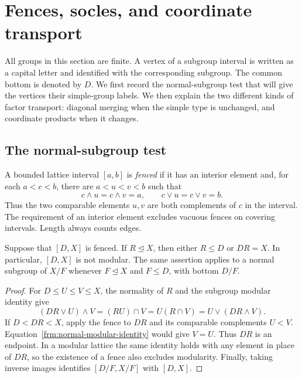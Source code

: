 \section{Fences, socles, and coordinate transport}
\label{sec:framework}

All groups in this section are finite. A vertex of a subgroup interval is
written as a capital letter and identified with the corresponding subgroup.
The common bottom is denoted by $D$. We first record the normal-subgroup
test that will give the vertices their simple-group labels. We then explain
the two different kinds of factor transport: diagonal merging when the
simple type is unchanged, and coordinate products when it changes.

\subsection{The normal-subgroup test}

\begin{definition}
A bounded lattice interval $[a,b]$ is \emph{fenced} if it has an interior
element and, for each $a<c<b$, there are $a<u<v<b$ such that
\[
 c\wedge u=c\wedge v=a,
 \qquad c\vee u=c\vee v=b.
\]
Thus the two comparable elements $u,v$ are both complements of $c$ in
the interval. The requirement of an interior element excludes vacuous
fences on covering intervals. Length always counts edges.
\end{definition}

\begin{lemma}
\label{frm:normal-test}
Suppose that $[D,X]$ is fenced. If $R\trianglelefteq X$, then either
$R\le D$ or $DR=X$. In particular, $[D,X]$ is not modular.
The same assertion applies to a normal subgroup of $X/F$ whenever
$F\trianglelefteq X$ and $F\le D$, with bottom $D/F$.
\end{lemma}

\begin{proof}
For $D\le U\le V\le X$, the normality of $R$ and the subgroup
modular identity give
\begin{equation}
 \label{frm:normal-modular-identity}
 (DR\vee U)\wedge V
   =(RU)\cap V
   =U(R\cap V)
   =U\vee(DR\wedge V).
\end{equation}
If $D<DR<X$, apply the fence to $DR$ and its comparable complements
$U<V$. Equation~\eqref{frm:normal-modular-identity} would give $V=U$.
Thus $DR$ is an endpoint. In a modular lattice the same identity holds
with any element in place of $DR$, so the existence of a fence also
excludes modularity. Finally, taking inverse images identifies
$[D/F,X/F]$ with $[D,X]$.
\end{proof}

